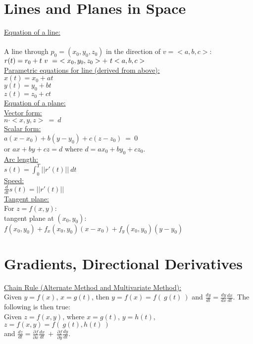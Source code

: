 \documentclass[10pt]{article}
\begin{document}
\section*{Lines and Planes in Space}
\noindent
\underline{Equation of a line:}\\\\
A line through $p_0 = (x_0,y_0,z_0)$ in the direction of $v = <a,b,c>$:\\
$
r(t) = r_0 + t \ v \ =  \ <x_0,y_0,z_0> + \ t <a,b,c>\\
$\\
\underline{Parametric equations for line (derived from above):}\\
$x(t) = x_0 + at$\\
$y(t) = y_0 + bt$ \\
$z(t) = z_0 + ct$\\


\noindent
\underline{Equation of a plane:}\\
\underline{Vector form:}\\
$n \cdot <x,y,z> \ = \ d$\\
\noindent
\underline{Scalar form:}\\
$a(x-x_0) + b(y-y_0) + c(z-z_0) \ = \ 0$\\
or $ax+by+cz = d$ where $d = ax_0 + by_0 + cz_0$.\\
\noindent
\underline{Arc length:}\\
$
s(t) = \int_0^T ||r'(t)|| \ dt
$\\
\noindent
\underline{Speed:}\\
$
\frac{d}{dt}s(t) = ||r'(t)||
$\\

\clearpage
\underline{Tangent plane:}\\
For $z = f(x,y)$:\\
tangent plane at $(x_0,y_0)$: $f(x_0,y_0)+f_x(x_0,y_0)(x-x_0)+f_y(x_0,y_0)(y-y_0)$\\

\section*{Gradients, Directional Derivatives}
\underline{Chain Rule (Alternate Method and Multivariate Method):}\\
Given $y= f(x)$, $x= g(t)$, then $y = f(x) = f( \ g(t) \ )$ and $\frac{dy}{dt} = \frac{dy}{dx} \frac{dx}{dt}$.
The following is then true:\\
Given $z = f(x,y)$, where $x= g(t)$, $y= h(t)$, $z = f(x,y) = f( \ g(t), h(t) \ )$\\
and $\frac{dz}{dt} = \frac{\partial{f}}{\partial{x}} \frac{dx}{dt} \ + \ \frac{\partial{f}}{\partial{y}} \frac{dy}{dt}$.\\
\end{document}
